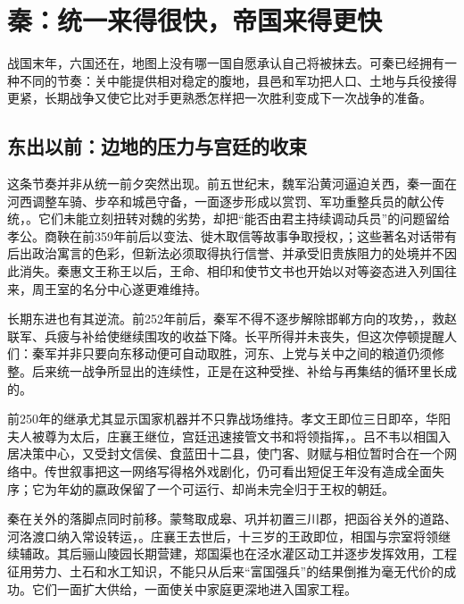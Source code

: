 \section{秦：统一来得很快，帝国来得更快}

战国末年，六国还在，地图上没有哪一国自愿承认自己将被抹去。可秦已经拥有一种不同的节奏：关中能提供相对稳定的腹地，县邑和军功把人口、土地与兵役接得更紧，长期战争又使它比对手更熟悉怎样把一次胜利变成下一次战争的准备。

\subsection{东出以前：边地的压力与宫廷的收束}

这条节奏并非从统一前夕突然出现。前五世纪末，魏军沿黄河逼迫关西，秦一面在河西调整车骑、步卒和城邑守备，一面逐步形成以赏罚、军功重整兵员的献公传统，。它们未能立刻扭转对魏的劣势，却把“能否由君主持续调动兵员”的问题留给孝公。商鞅在前359年前后以变法、徙木取信等故事争取授权，；这些著名对话带有后出政治寓言的色彩，但新法必须取得执行信誉、并承受旧贵族阻力的处境并不因此消失。秦惠文王称王以后，王命、相印和使节文书也开始以对等姿态进入列国往来，周王室的名分中心遂更难维持。

长期东进也有其逆流。前252年前后，秦军不得不逐步解除邯郸方向的攻势，，救赵联军、兵疲与补给使继续围攻的收益下降。长平所得并未丧失，但这次停顿提醒人们：秦军并非只要向东移动便可自动取胜，河东、上党与关中之间的粮道仍须修整。后来统一战争所显出的连续性，正是在这种受挫、补给与再集结的循环里长成的。

前250年的继承尤其显示国家机器并不只靠战场维持。孝文王即位三日即卒，华阳夫人被尊为太后，庄襄王继位，宫廷迅速接管文书和将领指挥，。吕不韦以相国入居决策中心，又受封文信侯、食蓝田十二县，使门客、财赋与相位暂时合在一个网络中。传世叙事把这一网络写得格外戏剧化，仍可看出短促王年没有造成全面失序；它为年幼的嬴政保留了一个可运行、却尚未完全归于王权的朝廷。

秦在关外的落脚点同时前移。蒙骜取成皋、巩并初置三川郡，把函谷关外的道路、河洛渡口纳入常设转运，。庄襄王去世后，十三岁的王政即位，相国与宗室将领继续辅政。其后骊山陵园长期营建，郑国渠也在泾水灌区动工并逐步发挥效用，工程征用劳力、土石和水工知识，不能只从后来“富国强兵”的结果倒推为毫无代价的成功。它们一面扩大供给，一面使关中家庭更深地进入国家工程。


